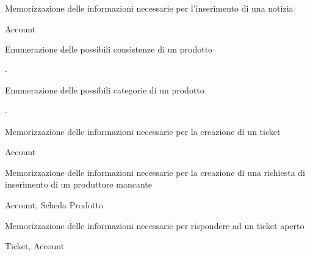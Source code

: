 
{\begin{itemWork}
	\item Memorizzazione delle informazioni necessarie per l'inserimento di una notizia
\end{itemWork}}
{\begin{itemWork}
	\item Account
\end{itemWork}}


{\begin{itemWork}
	\item Enumerazione delle possibili consistenze di un prodotto
\end{itemWork}}
{-}


{\begin{itemWork}
	\item Enumerazione delle possibili categorie di un prodotto
\end{itemWork}}
{-}


{\begin{itemWork}
	\item Memorizzazione delle informazioni necessarie per la creazione di un ticket
\end{itemWork}}
{\begin{itemWork}
	\item Account
\end{itemWork}}


{\begin{itemWork}
	\item Memorizzazione delle informazioni necessarie per la creazione di una richiesta di inserimento di un produttore mancante
\end{itemWork}}
{\begin{itemWork}
	\item Account, Scheda Prodotto
\end{itemWork}}



{\begin{itemWork}
	\item Memorizzazione delle informazioni necessarie per rispondere ad un ticket aperto
\end{itemWork}}
{\begin{itemWork}
	\item Ticket, Account
\end{itemWork}}

